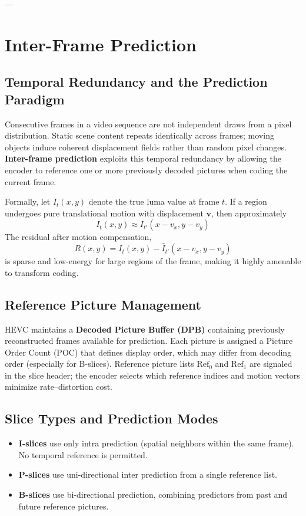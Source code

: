 \documentclass[11pt,journal,onecolumn]{IEEEtran}
\begin{document}
---

\section{Inter-Frame Prediction}

\subsection{Temporal Redundancy and the Prediction Paradigm}
Consecutive frames in a video sequence are not independent draws from a pixel distribution. Static scene content repeats identically across frames; moving objects induce coherent displacement fields rather than random pixel changes. \textbf{Inter-frame prediction} exploits this temporal redundancy by allowing the encoder to reference one or more previously decoded pictures when coding the current frame.

Formally, let $I_t(x, y)$ denote the true luma value at frame $t$. If a region undergoes pure translational motion with displacement $\mathbf{v}$, then approximately
\begin{equation}
I_t(x, y) \approx I_{t'}(x - v_x, y - v_y)
\end{equation}
The residual after motion compensation,
\begin{equation}
R(x, y) = I_t(x, y) - \hat{I}_{t'}(x - v_x, y - v_y)
\end{equation}
is sparse and low-energy for large regions of the frame, making it highly amenable to transform coding.

\subsection{Reference Picture Management}
HEVC maintains a \textbf{Decoded Picture Buffer (DPB)} containing previously reconstructed frames available for prediction. Each picture is assigned a Picture Order Count (POC) that defines display order, which may differ from decoding order (especially for B-slices). Reference picture lists $\mathrm{Ref}_0$ and $\mathrm{Ref}_1$ are signaled in the slice header; the encoder selects which reference indices and motion vectors minimize rate--distortion cost.

\subsection{Slice Types and Prediction Modes}
\begin{itemize}
    \item \textbf{I-slices} use only intra prediction (spatial neighbors within the same frame). No temporal reference is permitted.
    \item \textbf{P-slices} use uni-directional inter prediction from a single reference list.
    \item \textbf{B-slices} use bi-directional prediction, combining predictors from past and future reference pictures.
\end{itemize}
\end{document}
